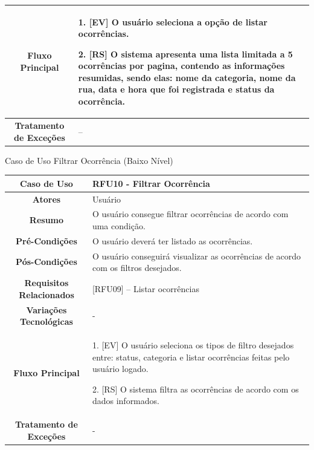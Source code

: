 \begin{apendicesenv}
\begin{quadro}[htb]
\begin{tabular}{|c|p{11cm}|}
		\textbf{Fluxo Principal} &
		\parbox[t]{11cm}{
			\raggedright
			1. [EV] O usuário seleciona a opção de listar ocorrências.\par
			2. [RS] O sistema apresenta uma lista limitada a 5 ocorrências por pagina, contendo as informações resumidas, sendo elas: nome da categoria, nome da rua, data e hora que foi registrada e status da ocorrência. 
		}
		\\ \hline
		
		\textbf{Tratamento de Exceções} &
		\parbox[t]{11cm}{
			\raggedright
			--
		}
		\\ \hline
	\end{tabular}
	
\end{quadro}

\begin{quadro}[htb]
	\centering
	\caption{\label{quadro_rfu10}Caso de Uso Filtrar Ocorrência (Baixo Nível)}
	\small
	\renewcommand{\arraystretch}{1.1}
	
	\begin{tabular}{|c|p{11cm}|}
		\hline
		\textbf{Caso de Uso} & RFU10 - Filtrar Ocorrência \\ \hline
		\textbf{Atores} & Usuário \\ \hline
		\textbf{Resumo} & O usuário consegue filtrar ocorrências de acordo com uma condição. \\ \hline
		\textbf{Pré-Condições} & O usuário deverá ter listado as ocorrências. \\ \hline
		\textbf{Pós-Condições} & O usuário conseguirá visualizar as ocorrências de acordo com os filtros desejados. \\ \hline
		\textbf{Requisitos Relacionados} & [RFU09] -- Listar ocorrências \\ \hline
		\textbf{Variações Tecnológicas} & - \\ \hline
		
		\textbf{Fluxo Principal} &
		\parbox[t]{11cm}{
			\raggedright
			1. [EV] O usuário seleciona os tipos de filtro desejados entre: status, categoria e listar ocorrências feitas pelo usuário logado.\par
			2. [RS] O sistema filtra as ocorrências de acordo com os dados informados.
		}
		\\ \hline
		
		\textbf{Tratamento de Exceções} &
		\parbox[t]{11cm}{
			\raggedright
			-
		}
		\\ \hline
	\end{tabular}
	

\end{quadro}
\end{apendicesenv}
